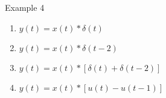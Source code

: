 \begin{frame}{Example 4}
    \begin{enumerate}
        \item $y(t) = x(t) \ast \delta(t)$
        \item $y(t) = x(t) \ast \delta(t - 2)$
        \item $y(t) = x(t) \ast [\delta(t) + \delta(t - 2)]$
        \item $y(t) = x(t) \ast [u(t) - u(t-1)]$
    \end{enumerate}

    
\end{frame}